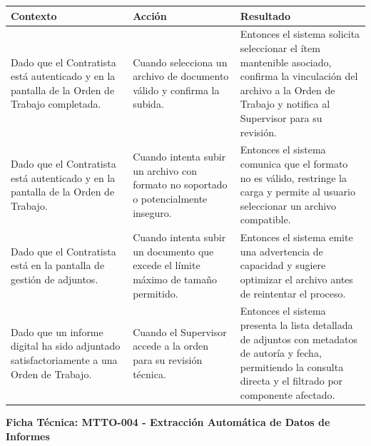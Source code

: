 \footnotesize\begin{longtable}{|p{0.28\textwidth}|p{0.32\textwidth}|p{0.34\textwidth}|}\hline
\textbf{Contexto} & \textbf{Acción} & \textbf{Resultado} \\ \hline
\parbox[t]{\linewidth}{Dado que el Contratista está autenticado y en la pantalla de la Orden de Trabajo completada.} & \parbox[t]{\linewidth}{Cuando selecciona un archivo de documento válido y confirma la subida.} & \parbox[t]{\linewidth}{Entonces el sistema solicita seleccionar el ítem mantenible asociado, confirma la vinculación del archivo a la Orden de Trabajo y notifica al Supervisor para su revisión.} \\ \hline
\parbox[t]{\linewidth}{Dado que el Contratista está autenticado y en la pantalla de la Orden de Trabajo.} & \parbox[t]{\linewidth}{Cuando intenta subir un archivo con formato no soportado o potencialmente inseguro.} & \parbox[t]{\linewidth}{Entonces el sistema comunica que el formato no es válido, restringe la carga y permite al usuario seleccionar un archivo compatible.} \\ \hline
\parbox[t]{\linewidth}{Dado que el Contratista está en la pantalla de gestión de adjuntos.} & \parbox[t]{\linewidth}{Cuando intenta subir un documento que excede el límite máximo de tamaño permitido.} & \parbox[t]{\linewidth}{Entonces el sistema emite una advertencia de capacidad y sugiere optimizar el archivo antes de reintentar el proceso.} \\ \hline
\parbox[t]{\linewidth}{Dado que un informe digital ha sido adjuntado satisfactoriamente a una Orden de Trabajo.} & \parbox[t]{\linewidth}{Cuando el Supervisor accede a la orden para su revisión técnica.} & \parbox[t]{\linewidth}{Entonces el sistema presenta la lista detallada de adjuntos con metadatos de autoría y fecha, permitiendo la consulta directa y el filtrado por componente afectado.} \\ \hline
\end{longtable}\normalsize
\vspace{1em}
\noindent\textbf{Ficha Técnica: MTTO-004 - Extracción Automática de Datos de Informes}
\footnotesize\setlength{\tabcolsep}{4pt}\renewcommand{\arraystretch}{1.2}

